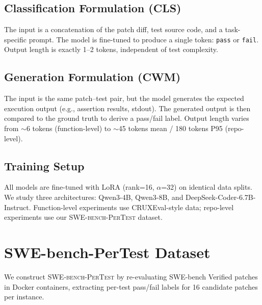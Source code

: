 \documentclass[11pt,a4paper]{article}
\begin{document}
\subsection{Classification Formulation (CLS)}

The input is a concatenation of the patch diff, test source code, and a task-specific prompt.
The model is fine-tuned to produce a single token: \texttt{pass} or \texttt{fail}.
Output length is exactly 1--2 tokens, independent of test complexity.

\subsection{Generation Formulation (CWM)}

The input is the same patch--test pair, but the model generates the expected execution output (e.g., assertion results, stdout).
The generated output is then compared to the ground truth to derive a pass/fail label.
Output length varies from $\sim$6 tokens (function-level) to $\sim$45 tokens mean / 180 tokens P95 (repo-level).

\subsection{Training Setup}

All models are fine-tuned with LoRA (rank=16, $\alpha$=32) on identical data splits.
We study three architectures: Qwen3-4B, Qwen3-8B, and DeepSeek-Coder-6.7B-Instruct.
Function-level experiments use CRUXEval-style data; repo-level experiments use our \textsc{SWE-bench-PerTest} dataset.

\section{SWE-bench-PerTest Dataset}

We construct \textsc{SWE-bench-PerTest} by re-evaluating SWE-bench Verified patches in Docker containers, extracting per-test pass/fail labels for 16 candidate patches per instance.
\end{document}

